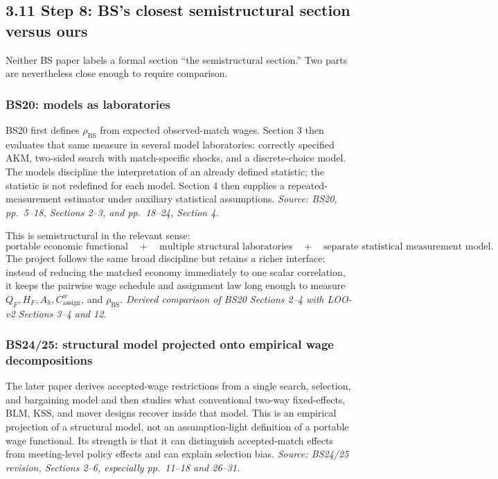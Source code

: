 \documentclass[11pt]{article}
\begin{document}
\subsection{3.11 Step 8: BS's closest semistructural section versus ours}

Neither BS paper labels a formal section ``the semistructural section.''  Two
parts are nevertheless close enough to require comparison.

\subsubsection{BS20: models as laboratories}

BS20 first defines \(\rho_{\mathrm{BS}}\) from expected observed-match wages.
Section 3 then evaluates that same measure in several model laboratories:
correctly specified AKM, two-sided search with match-specific shocks, and a
discrete-choice model.  The models discipline the interpretation of an
already defined statistic; the statistic is not redefined for each model.
Section 4 then supplies a repeated-measurement estimator under auxiliary
statistical assumptions.
\textit{Source: BS20, pp.\ 5--18, Sections 2--3, and pp.\ 18--24,
Section 4.}

This is semistructural in the relevant sense:
\[
\text{portable economic functional}
\quad+\quad
\text{multiple structural laboratories}
\quad+\quad
\text{separate statistical measurement model}.
\tag{T3.76}
\]
The project follows the same broad discipline but retains a richer interface:
instead of reducing the matched economy immediately to one scalar correlation,
it keeps the pairwise wage schedule and assignment law long enough to measure
\(Q_F,H_F,A_h,C^w_{\mathrm{assign}}\), and
\(\rho_{\mathrm{BS}}\).
\textit{Derived comparison of BS20 Sections 2--4 with LOO-v2 Sections
3--4 and 12.}

\subsubsection{BS24/25: structural model projected onto empirical wage decompositions}

The later paper derives accepted-wage restrictions from a single search,
selection, and bargaining model and then studies what conventional two-way
fixed-effects, BLM, KSS, and mover designs recover inside that model.  This is
an empirical projection of a structural model, not an assumption-light
definition of a portable wage functional.  Its strength is that it can
distinguish accepted-match effects from meeting-level policy effects and can
explain selection bias.
\textit{Source: BS24/25 revision, Sections 2--6, especially pp.\ 11--18 and
26--31.}
\end{document}

